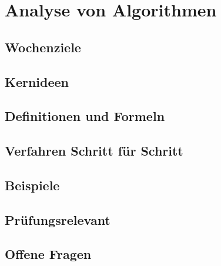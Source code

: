 \chapter{Analyse von Algorithmen}
\label{kap:05-analyse-algorithmen}

\section*{Wochenziele}
\begin{wochenziele}
\end{wochenziele}

\section{Kernideen}

\section{Definitionen und Formeln}

\section{Verfahren Schritt für Schritt}

\section{Beispiele}

\section{Prüfungsrelevant}

\section{Offene Fragen}

